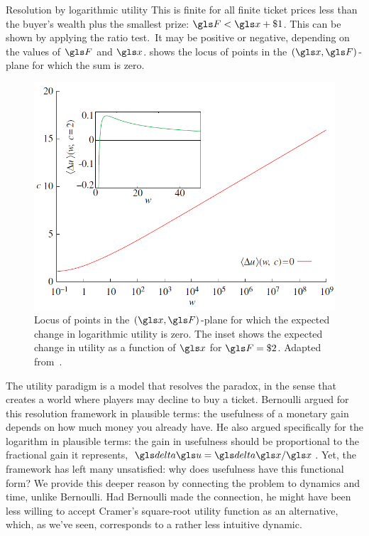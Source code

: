 \begin{itemize}
\begin{example}{Resolution by logarithmic utility}
This is finite for all finite ticket prices less than the buyer's wealth plus the smallest 
prize: $\F<\x+\$1$. This can be shown by applying the ratio 
test.\footnotemark\ It may be positive or negative, depending on the values 
of $\F$ and $\x$.  shows the locus of points in the $(\x,\F)$-plane 
for which the sum is zero.
\end{example}
\begin{figure}
\centering
\includegraphics[width=\textwidth]{./chapter_riskless/figs/gbar_zero.png}
\caption{Locus of points in the $(\x,\F)$-plane for which the expected change in 
logarithmic utility is zero. The inset shows the expected change in utility as a 
function of $\x$ for $\F=\$2$. Adapted from~\cite{Peters2011b}.}
\end{figure}

The utility paradigm is a model that resolves the paradox, in the sense that creates 
a world where players may decline to buy a ticket. Bernoulli argued for this resolution 
framework in plausible terms: the usefulness of a monetary gain depends on how 
much money you already have. He also argued specifically for the logarithm in 
plausible terms: the gain in usefulness should be proportional to the fractional gain 
it represents, $\d \gu = \d\x/\x$. Yet, the framework has left many unsatisfied: why 
does usefulness have this functional form? We provide this deeper reason by 
connecting the problem to dynamics and time, unlike Bernoulli. Had Bernoulli made 
the connection, he might have been less willing to accept Cramer's square-root utility 
function as an alternative, which, as we've seen, corresponds to a rather less intuitive dynamic.


\end{itemize}
